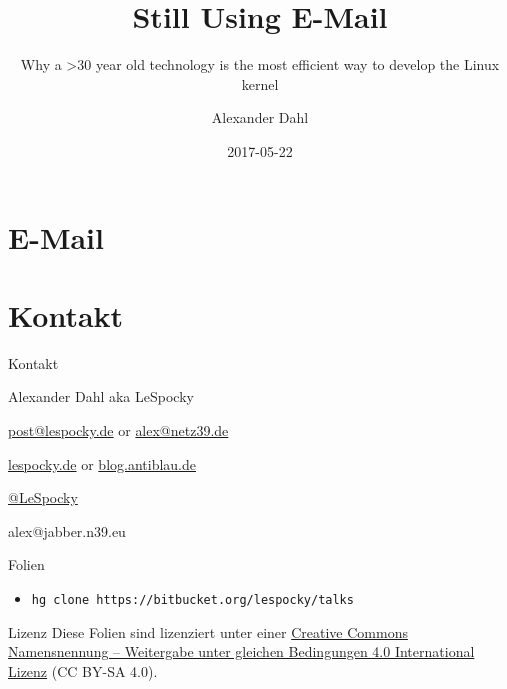 \documentclass{beamer}
\title{Still Using E-Mail}
\subtitle{Why a >30 year old technology is the most efficient way to develop the Linux kernel}
\author{Alexander Dahl}
\institute[lespocky.de]{\url{http://www.lespocky.de/}}
\date{2017-05-22}
\begin{document}
\begin{frame}
	\titlepage
\end{frame}

%    

\section{E-Mail}


\section{Kontakt}

\begin{frame}{Kontakt}
    \begin{block}{Alexander Dahl aka LeSpocky}
        \begin{description}[Twitter]
            \item [E-Mail] \href{mailto:post@lespocky.de}{post@lespocky.de}
                    or \href{mailto:alex@netz39.de}{alex@netz39.de}
            \item [WWW] \href{http://www.lespocky.de/}{lespocky.de} or
                    \href{http://blog.antiblau.de/}{blog.antiblau.de}
            \item [Twitter] \href{https://twitter.com/LeSpocky}{@LeSpocky}
            \item [XMPP] alex@jabber.n39.eu
        \end{description}
    \end{block}
    \begin{block}{Folien}
        \begin{itemize}
            \item \texttt{hg clone https://bitbucket.org/lespocky/talks}
        \end{itemize}
    \end{block}
    \begin{block}{Lizenz}
        Diese Folien sind lizenziert unter einer
        \href{http://creativecommons.org/licenses/by-sa/4.0/}{Creative Commons \\
        Namensnennung -- Weitergabe unter gleichen Bedingungen 4.0
        International Lizenz} (CC BY-SA 4.0).
    \end{block}
\end{frame}
\end{document}
